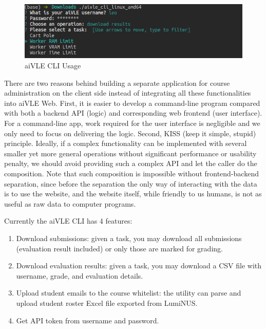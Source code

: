 \begin{figure}[H]
    \centering
    \includegraphics[width=\textwidth]{images/aivle-cli.png}
    \caption{aiVLE CLI Usage}
    \label{fig:aivle-cli}
\end{figure}

There are two reasons behind building a separate application for course administration on the client side instead of integrating all these functionalities into aiVLE Web. First, it is easier to develop a command-line program compared with both a backend API (logic) and corresponding web frontend (user interface). For a command-line app, work required for the user interface is negligible and we only need to focus on delivering the logic. Second, KISS (keep it simple, stupid) principle. Ideally, if a complex functionality can be implemented with several smaller yet more general operations without significant performance or usability penalty, we should avoid providing such a complex API and let the caller do the composition. Note that such composition is impossible without frontend-backend separation, since before the separation the only way of interacting with the data is to use the website, and the website itself, while friendly to us humans, is not as useful as raw data to computer programs.

Currently the aiVLE CLI has 4 features:

\begin{enumerate}
    \item Download submissions: given a task, you may download all submissions (evaluation result included) or only those are marked for grading.
    \item Download evaluation results: given a task, you may download a CSV file with username, grade, and evaluation details.
    \item Upload student emails to the course whitelist: the utility can parse and upload student roster Excel file exported from LumiNUS.
    \item Get API token from username and password.
\end{enumerate}